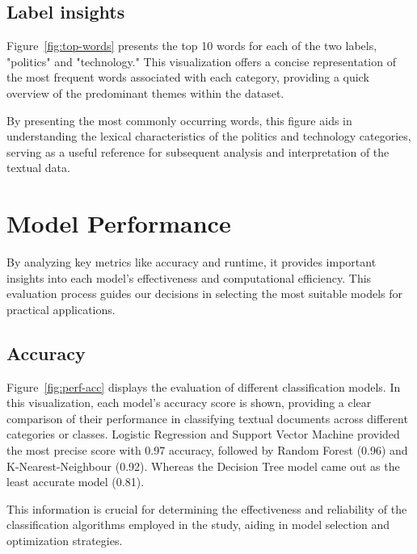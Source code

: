 \subsection{Label insights}


Figure~\ref{fig:top-words} presents the top 10 words for each of the two labels, "politics" and "technology." This visualization offers a concise representation of the most frequent words associated with each category, providing a quick overview of the predominant themes within the dataset.

By presenting the most commonly occurring words, this figure aids in understanding the lexical characteristics of the politics and technology categories, serving as a useful reference for subsequent analysis and interpretation of the textual data.

\section{Model Performance}

By analyzing key metrics like accuracy and runtime, it provides important insights into each model's effectiveness and computational efficiency. This evaluation process guides our decisions in selecting the most suitable models for practical applications.

\break

\subsection{Accuracy}


Figure~\ref{fig:perf-acc} displays the evaluation of different classification models. In this visualization, each model's accuracy score is shown, providing a clear comparison of their performance in classifying textual documents across different categories or classes. Logistic Regression and Support Vector Machine provided the most precise score with 0.97 accuracy, followed by Random Forest (0.96) and K-Nearest-Neighbour (0.92). Whereas the Decision Tree model came out as the least accurate model (0.81).

This information is crucial for determining the effectiveness and reliability of the classification algorithms employed in the study, aiding in model selection and optimization strategies.

